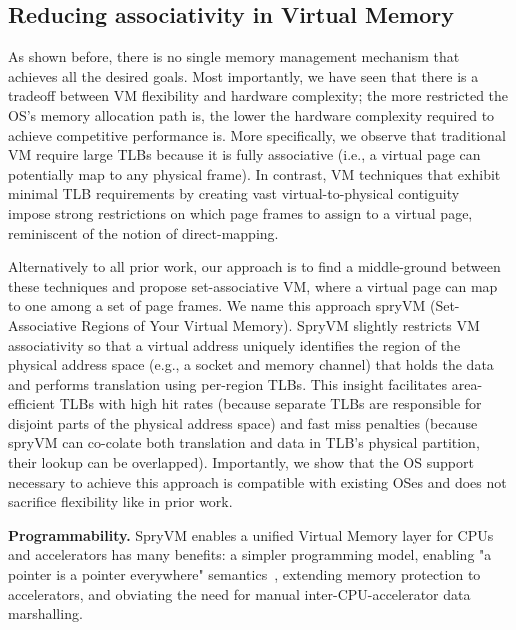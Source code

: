 \subsection{Reducing associativity in Virtual Memory}

As shown before, there is no single memory management mechanism that achieves all the desired goals. Most importantly, we have seen that there is a tradeoff between VM flexibility and hardware complexity; the more restricted the OS's memory allocation path is, the lower the hardware complexity required to achieve competitive performance is. More specifically, we observe that traditional VM require large TLBs because it is fully associative (i.e., a virtual page can potentially map to any physical frame). In contrast, VM techniques that exhibit minimal TLB requirements by creating vast virtual-to-physical contiguity~\cite{basu:efficient, gandhi:range, haria:devirtualizing} impose strong restrictions on which page frames to assign to a virtual page, reminiscent of the notion of direct-mapping. 

Alternatively to all prior work, our approach is to find a middle-ground between these techniques and propose set-associative VM, where a virtual page can map to one among a set of page frames. We name this approach spryVM (Set-Associative Regions of Your Virtual Memory). SpryVM slightly restricts VM associativity so that a virtual address uniquely
identifies the region of the physical address space (e.g., a socket and memory channel)
that holds the data and performs translation using per-region TLBs. This insight
facilitates area-efficient TLBs with high hit rates (because separate
TLBs are responsible for disjoint parts of the physical address space)
and fast miss penalties (because spryVM can co-colate both translation
and data in TLB's physical partition, their lookup can be
overlapped). Importantly, we show that the OS support necessary to
achieve this approach is compatible with existing OSes and does not
sacrifice flexibility like in prior work. 

\noindent\textbf{Programmability.} SpryVM enables a unified Virtual Memory layer for CPUs and accelerators has many benefits: a simpler programming model, enabling "a pointer is a pointer everywhere" semantics~\cite{pichai:architectural, power:supporting, vesely:observation}, extending memory protection to accelerators, and obviating the need for manual inter-CPU-accelerator data marshalling.  

